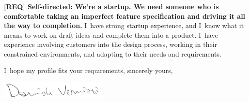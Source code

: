 \documentclass[a4paper,sans]{moderncv} %
\begin{document}
\textbf{[REQ] Self-directed: We’re a startup. We need someone who is comfortable taking an imperfect feature specification and driving it all the way to completion.}
I~have strong startup experience, and I~know what it means to work on draft ideas and complete them into a product. I~have experience involving customers into the design process, working in their constrained environments, and adapting to their needs and requirements.

I~hope my profile fits your requirements, sincerely yours,

\vspace{1.5em}

\includegraphics[width=0.4\textwidth]{firmaPenna}
\makeletterclosing %


\end{document}
